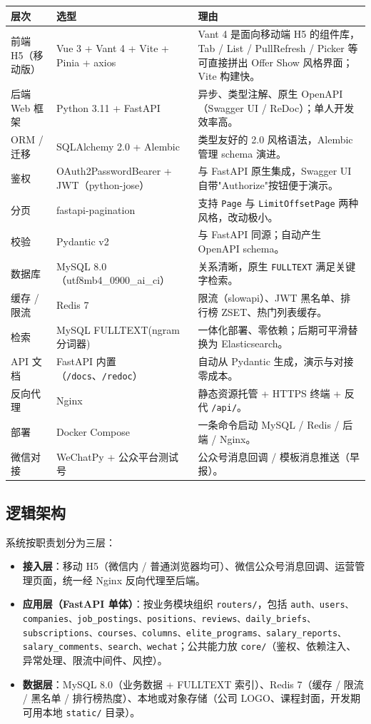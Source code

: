 \documentclass[11pt,a4paper]{ctexart}
\begin{document}
\begin{tabularx}{\textwidth}{p{3cm}p{4.4cm}X}
\toprule
\textbf{层次} & \textbf{选型} & \textbf{理由}\\
\midrule
前端 H5（移动版） & Vue 3 + Vant 4 + Vite + Pinia + axios & Vant 4 是面向移动端 H5 的组件库，Tab / List / PullRefresh / Picker 等可直接拼出 Offer Show 风格界面；Vite 构建快。\\
后端 Web 框架 & Python 3.11 + FastAPI & 异步、类型注解、原生 OpenAPI（Swagger UI / ReDoc）；单人开发效率高。\\
ORM / 迁移 & SQLAlchemy 2.0 + Alembic & 类型友好的 2.0 风格语法，Alembic 管理 schema 演进。\\
鉴权 & OAuth2PasswordBearer + JWT（python-jose）& 与 FastAPI 原生集成，Swagger UI 自带"Authorize"按钮便于演示。\\
分页 & fastapi-pagination & 支持 \texttt{Page} 与 \texttt{LimitOffsetPage} 两种风格，改动极小。\\
校验 & Pydantic v2 & 与 FastAPI 同源；自动产生 OpenAPI schema。\\
数据库 & MySQL 8.0（utf8mb4\_0900\_ai\_ci）& 关系清晰，原生 \texttt{FULLTEXT} 满足关键字检索。\\
缓存 / 限流 & Redis 7 & 限流（slowapi）、JWT 黑名单、排行榜 ZSET、热门列表缓存。\\
检索 & MySQL FULLTEXT(ngram 分词器) & 一体化部署、零依赖；后期可平滑替换为 Elasticsearch。\\
API 文档 & FastAPI 内置（\texttt{/docs}、\texttt{/redoc}）& 自动从 Pydantic 生成，演示与对接零成本。\\
反向代理 & Nginx & 静态资源托管 + HTTPS 终端 + 反代 \texttt{/api/}。\\
部署 & Docker Compose & 一条命令启动 MySQL / Redis / 后端 / Nginx。\\
微信对接 & WeChatPy + 公众平台测试号 & 公众号消息回调 / 模板消息推送（早报）。\\
\bottomrule
\end{tabularx}

\subsection{逻辑架构}
系统按职责划分为三层：

\begin{itemize}[leftmargin=2em]
    \item \textbf{接入层}：移动 H5（微信内 / 普通浏览器均可）、微信公众号消息回调、运营管理页面，统一经 Nginx 反向代理至后端。
    \item \textbf{应用层（FastAPI 单体）}：按业务模块组织 \texttt{routers/}，包括 \texttt{auth、users、companies、job\_postings、positions、reviews、daily\_briefs、subscriptions、courses、columns、elite\_programs、salary\_reports、salary\_comments、search、wechat}；公共能力放 \texttt{core/}（鉴权、依赖注入、异常处理、限流中间件、风控）。
    \item \textbf{数据层}：MySQL 8.0（业务数据 + FULLTEXT 索引）、Redis 7（缓存 / 限流 / 黑名单 / 排行榜热度）、本地或对象存储（公司 LOGO、课程封面，开发期可用本地 \texttt{static/} 目录）。
\end{itemize}
\end{document}
